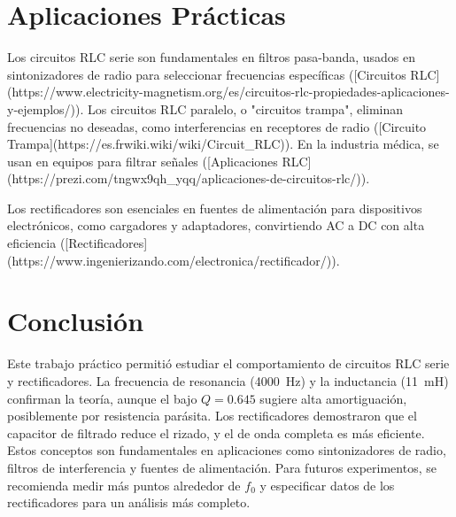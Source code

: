 \documentclass[a4paper,12pt]{article}
\begin{document}
\section{Aplicaciones Prácticas}
Los circuitos RLC serie son fundamentales en filtros pasa-banda, usados en sintonizadores de radio para seleccionar frecuencias específicas ([Circuitos RLC](https://www.electricity-magnetism.org/es/circuitos-rlc-propiedades-aplicaciones-y-ejemplos/)). Los circuitos RLC paralelo, o "circuitos trampa", eliminan frecuencias no deseadas, como interferencias en receptores de radio ([Circuito Trampa](https://es.frwiki.wiki/wiki/Circuit_RLC)). En la industria médica, se usan en equipos para filtrar señales ([Aplicaciones RLC](https://prezi.com/tngwx9qh_yqq/aplicaciones-de-circuitos-rlc/)).

Los rectificadores son esenciales en fuentes de alimentación para dispositivos electrónicos, como cargadores y adaptadores, convirtiendo AC a DC con alta eficiencia ([Rectificadores](https://www.ingenierizando.com/electronica/rectificador/)).

\section{Conclusión}
Este trabajo práctico permitió estudiar el comportamiento de circuitos RLC serie y rectificadores. La frecuencia de resonancia (\SI{4000}{\hertz}) y la inductancia (\SI{11}{\milli\henry}) confirman la teoría, aunque el bajo \( Q = 0.645 \) sugiere alta amortiguación, posiblemente por resistencia parásita. Los rectificadores demostraron que el capacitor de filtrado reduce el rizado, y el de onda completa es más eficiente. Estos conceptos son fundamentales en aplicaciones como sintonizadores de radio, filtros de interferencia y fuentes de alimentación. Para futuros experimentos, se recomienda medir más puntos alrededor de \( f_0 \) y especificar datos de los rectificadores para un análisis más completo.
\end{document}
